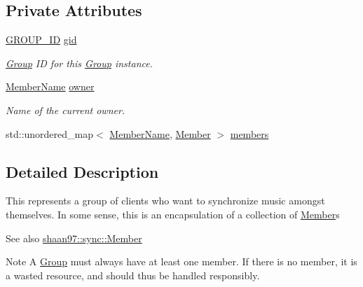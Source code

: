 \subsection*{Private Attributes}
\begin{DoxyCompactItemize}
\item 
\hyperlink{namespaceshaan97_1_1sync_a34cebf175d27dfc3d82f24608f7043c1}{G\+R\+O\+U\+P\+\_\+\+ID} \hyperlink{classshaan97_1_1sync_1_1_group_a91de861ecc3bde21758b99e98ec08112}{gid}
\begin{DoxyCompactList}\small\item\em \hyperlink{classshaan97_1_1sync_1_1_group}{Group} ID for this {\ttfamily \hyperlink{classshaan97_1_1sync_1_1_group}{Group}} instance. \end{DoxyCompactList}\item 
\hyperlink{namespaceshaan97_1_1sync_af59c2c9185f7cde547b79fbe0bf8ec71}{Member\+Name} \hyperlink{classshaan97_1_1sync_1_1_group_a730370c59bdfa2bf793c677825e29acf}{owner}
\begin{DoxyCompactList}\small\item\em Name of the current owner. \end{DoxyCompactList}\item 
std\+::unordered\+\_\+map$<$ \hyperlink{namespaceshaan97_1_1sync_af59c2c9185f7cde547b79fbe0bf8ec71}{Member\+Name}, \hyperlink{classshaan97_1_1sync_1_1_member}{Member} $>$ \hyperlink{classshaan97_1_1sync_1_1_group_ac285f584893e954872679670c2092fda}{members}
\end{DoxyCompactItemize}


\subsection{Detailed Description}
This represents a group of clients who want to synchronize music amongst themselves. In some sense, this is an encapsulation of a collection of {\ttfamily \hyperlink{classshaan97_1_1sync_1_1_member}{Member}}s

\begin{DoxySeeAlso}{See also}
\hyperlink{classshaan97_1_1sync_1_1_member}{shaan97\+::sync\+::\+Member}
\end{DoxySeeAlso}
\begin{DoxyNote}{Note}
A {\ttfamily \hyperlink{classshaan97_1_1sync_1_1_group}{Group}} must always have at least one member. If there is no member, it is a wasted resource, and should thus be handled responsibly. 
\end{DoxyNote}


